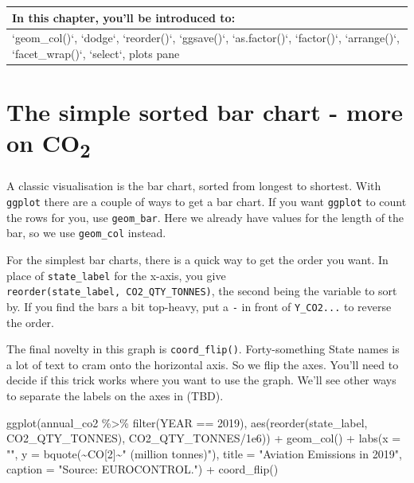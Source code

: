 \documentclass[
]{book}
\newenvironment{Shaded}{\begin{snugshade}}{\end{snugshade}}
\newcommand{\AttributeTok}[1]{\textcolor[rgb]{0.77,0.63,0.00}{#1}}
\newcommand{\DecValTok}[1]{\textcolor[rgb]{0.00,0.00,0.81}{#1}}
\newcommand{\FloatTok}[1]{\textcolor[rgb]{0.00,0.00,0.81}{#1}}
\newcommand{\FunctionTok}[1]{\textcolor[rgb]{0.00,0.00,0.00}{#1}}
\newcommand{\NormalTok}[1]{#1}
\newcommand{\SpecialCharTok}[1]{\textcolor[rgb]{0.00,0.00,0.00}{#1}}
\newcommand{\StringTok}[1]{\textcolor[rgb]{0.31,0.60,0.02}{#1}}
\begin{document}
\begin{tabular}{l}
\hline
In this chapter, you'll be introduced to:\\
\hline
`geom\_col()`, `dodge`, `reorder()`, `ggsave()`, `as.factor()`, `factor()`, `arrange()`, `facet\_wrap()`, `select`, plots pane\\
\hline
\end{tabular}

\hypertarget{firstsortedbar}{%
\section{\texorpdfstring{The simple sorted bar chart - more on CO\textsubscript{2}}{The simple sorted bar chart - more on CO2}}\label{firstsortedbar}}

A classic visualisation is the bar chart, sorted from longest to shortest. With \texttt{ggplot} there are a couple of ways to get a bar chart. If you want \texttt{ggplot} to count the rows for you, use \texttt{geom\_bar}. Here we already have values for the length of the bar, so we use \texttt{geom\_col} instead.

For the simplest bar charts, there is a quick way to get the order you want. In place of \texttt{state\_label} for the x-axis, you give \texttt{reorder(state\_label,\ CO2\_QTY\_TONNES)}, the second being the variable to sort by. If you find the bars a bit top-heavy, put a \texttt{-} in front of \texttt{Y\_CO2...} to reverse the order.

The final novelty in this graph is \texttt{coord\_flip()}. Forty-something State names is a lot of text to cram onto the horizontal axis. So we flip the axes. You'll need to decide if this trick works where you want to use the graph. We'll see other ways to separate the labels on the axes in (TBD).

\begin{Shaded}
\begin{Highlighting}[]
\FunctionTok{ggplot}\NormalTok{(annual\_co2 }\SpecialCharTok{\%\textgreater{}\%} 
         \FunctionTok{filter}\NormalTok{(YEAR }\SpecialCharTok{==} \DecValTok{2019}\NormalTok{), }
       \FunctionTok{aes}\NormalTok{(}\FunctionTok{reorder}\NormalTok{(state\_label, CO2\_QTY\_TONNES),}
\NormalTok{           CO2\_QTY\_TONNES}\SpecialCharTok{/}\FloatTok{1e6}\NormalTok{)) }\SpecialCharTok{+}
  \FunctionTok{geom\_col}\NormalTok{() }\SpecialCharTok{+}
  \FunctionTok{labs}\NormalTok{(}\AttributeTok{x =} \StringTok{""}\NormalTok{, }
       \AttributeTok{y =} \FunctionTok{bquote}\NormalTok{(}\SpecialCharTok{\textasciitilde{}}\NormalTok{CO[}\DecValTok{2}\NormalTok{]}\SpecialCharTok{\textasciitilde{}}\StringTok{" (million tonnes)"}\NormalTok{),}
       \AttributeTok{title =} \StringTok{"Aviation Emissions in 2019"}\NormalTok{,}
       \AttributeTok{caption =} \StringTok{"Source: EUROCONTROL."}\NormalTok{) }\SpecialCharTok{+}
  \FunctionTok{coord\_flip}\NormalTok{()}
\end{Highlighting}
\end{Shaded}
\end{document}
